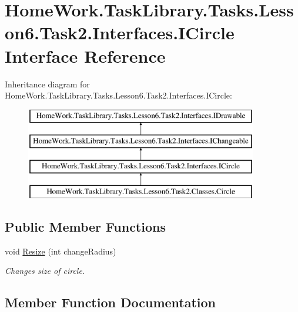 \hypertarget{interface_home_work_1_1_task_library_1_1_tasks_1_1_lesson6_1_1_task2_1_1_interfaces_1_1_i_circle}{}\section{Home\+Work.\+Task\+Library.\+Tasks.\+Lesson6.\+Task2.\+Interfaces.\+I\+Circle Interface Reference}
\label{interface_home_work_1_1_task_library_1_1_tasks_1_1_lesson6_1_1_task2_1_1_interfaces_1_1_i_circle}
Inheritance diagram for Home\+Work.\+Task\+Library.\+Tasks.\+Lesson6.\+Task2.\+Interfaces.\+I\+Circle\+:\begin{figure}[H]
\begin{center}
\leavevmode
\includegraphics[height=4.000000cm]{interface_home_work_1_1_task_library_1_1_tasks_1_1_lesson6_1_1_task2_1_1_interfaces_1_1_i_circle}
\end{center}
\end{figure}
\subsection*{Public Member Functions}
\begin{DoxyCompactItemize}
\item 
void \mbox{\hyperlink{interface_home_work_1_1_task_library_1_1_tasks_1_1_lesson6_1_1_task2_1_1_interfaces_1_1_i_circle_a8f8ddf2b20c4a64c9b107896ef72546c}{Resize}} (int change\+Radius)
\begin{DoxyCompactList}\small\item\em Changes size of circle. \end{DoxyCompactList}\end{DoxyCompactItemize}


\subsection{Member Function Documentation}
\mbox{\label{interface_home_work_1_1_task_library_1_1_tasks_1_1_lesson6_1_1_task2_1_1_interfaces_1_1_i_circle_a8f8ddf2b20c4a64c9b107896ef72546c}} 
